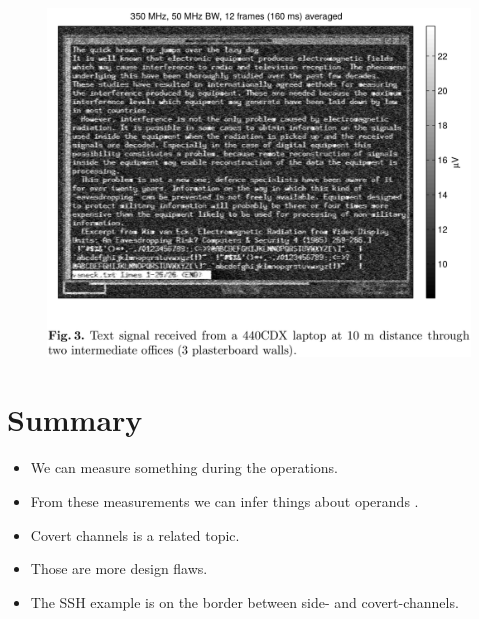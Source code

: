\begin{frame}
  \begin{figure}
    \includegraphics[height=0.9\textheight]{em-laptop.png}
  \end{figure}
\end{frame}

\section{Summary}

\begin{frame}
  \begin{itemize}
    \item We can measure something during the operations.
    \item From these measurements we can infer things about operands \etc.
  \end{itemize}

  \pause

  \begin{remark}
    \begin{itemize}
      \item Covert channels is a related topic.
      \item Those are more design flaws.
      \item The SSH example is on the border between side- and covert-channels.
    \end{itemize}
  \end{remark}
\end{frame}




\begin{frame}[allowframebreaks]
  \small
  \printbibliography{}
\end{frame}

